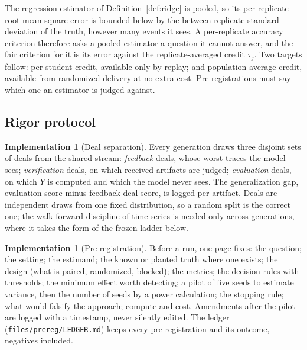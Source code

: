 \documentclass[11pt]{article}
\numberwithin{theorem}{section}
\theoremstyle{definition}
\newtheorem{implementation}[theorem]{Implementation}
\theoremstyle{problemstyle}
\begin{document}
\begin{remark}
The regression estimator of Definition~\ref{def:ridge} is pooled, so its per-replicate root mean square error is
bounded below by the between-replicate standard deviation of the truth, however many events it sees. A per-replicate
accuracy criterion therefore asks a pooled estimator a question it cannot answer, and the fair criterion for it is its
error against the replicate-averaged credit $\bar\tau_j$. Two targets follow: per-student credit, available only by
replay; and population-average credit, available from randomized delivery at no extra cost. Pre-registrations must say
which one an estimator is judged against.
\end{remark}

\subsection{Rigor protocol}\label{sec:rigor}

\begin{implementation}[Deal separation]
Every generation draws three disjoint sets of deals from the shared stream: \emph{feedback} deals, whose worst traces
the model sees; \emph{verification} deals, on which received artifacts are judged; \emph{evaluation} deals, on which
$Y$ is computed and which the model never sees. The generalization gap, evaluation score minus feedback-deal score, is
logged per artifact. Deals are independent draws from one fixed distribution, so a random split is the correct one;
the walk-forward discipline of time series is needed only across generations, where it takes the form of the frozen
ladder below.
\end{implementation}

\begin{implementation}[Pre-registration]
Before a run, one page fixes: the question; the setting; the estimand; the known or planted truth where one exists;
the design (what is paired, randomized, blocked); the metrics; the decision rules with thresholds; the minimum effect
worth detecting; a pilot of five seeds to estimate variance, then the number of seeds by a power calculation; the
stopping rule; what would falsify the approach; compute and cost. Amendments after the pilot are logged with a
timestamp, never silently edited. The ledger (\texttt{files/prereg/LEDGER.md}) keeps every pre-registration and its
outcome, negatives included.
\end{implementation}
\end{document}
